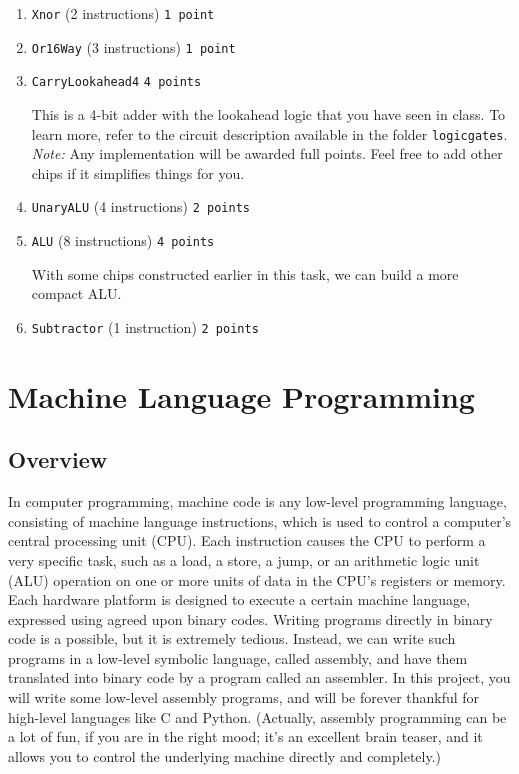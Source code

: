 \documentclass[11pt]{article}
\begin{document}
\begin{enumerate}
	\item \texttt{Xnor} (2 instructions) \hspace*{\fill} \texttt{\small  1 point}
	\item \texttt{Or16Way} (3 instructions) \hspace*{\fill} \texttt{\small  1 point}
	\item \texttt{CarryLookahead4} \hspace*{\fill} \texttt{\small  4 points}
	
	This is a 4-bit adder with the lookahead logic that you have seen in class. To learn more, refer to the circuit description available in the folder \texttt{logicgates}. 
	\emph{Note:} Any implementation will be awarded full points. Feel free to add other chips if it simplifies things for you.
	\item \texttt{UnaryALU} (4 instructions)  \hspace*{\fill} \texttt{\small  2 points}
	\item \texttt{ALU} (8 instructions) \hspace*{\fill} \texttt{\small  4 points}
	
	With some chips constructed earlier in this task, we can build a more compact ALU.
	\item \texttt{Subtractor} (1 instruction) \hspace*{\fill} \texttt{\small  2 points}
\end{enumerate}

\section{Machine Language Programming}

\subsection{Overview}
In computer programming, machine code is any low-level programming language, consisting of machine language instructions, which is used to control a computer's central processing unit (CPU). Each instruction causes the CPU to perform a very specific task, such as a load, a store, a jump, or an arithmetic logic unit (ALU) operation on one or more units of data in the CPU's registers or memory.
Each hardware platform is designed to execute a certain machine language, expressed using agreed upon binary codes. Writing programs directly in binary code is a possible, but it is extremely tedious.
 Instead, we can write such programs in a low-level symbolic language, called assembly,
and have them translated into binary code by a program called an assembler. In this project, you
will write some low-level assembly programs, and will be forever thankful for high-level languages
like C and Python. (Actually, assembly programming can be a lot of fun, if you are in the right
mood; it’s an excellent brain teaser, and it allows you to control the underlying machine directly
and completely.)
\end{document}
